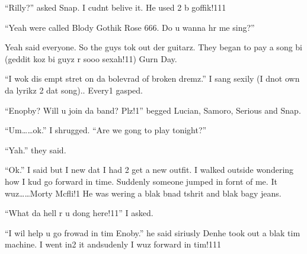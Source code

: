 \enquote{Rilly?} asked Snap. I cudnt belive it. He used 2 b goffik!111

\enquote{Yeah were called Blody Gothik Rose 666. Do u wanna hr me sing?}

Yeah said everyone. So the guys tok out der guitarz. They began to pay a song bi (geddit koz bi guyz r sooo sexah!11) Gurn Day.

\enquote{I wok dis empt stret on da bolevrad of broken dremz.} I sang sexily (I dnot own da lyrikz 2 dat song).. Every1 gasped.

\enquote{Enopby? Will u join da band? Plz!1} begged Lucian, Samoro, Serious and Snap.

\enquote{Um\ldots\ldots ok.} I shrugged. \enquote{Are we gong to play tonight?}

\enquote{Yah.} they said.

\enquote{Ok.} I said but I new dat I had 2 get a new outfit. I walked outside wondering how I kud go forward in time. Suddenly someone jumped in fornt of me. It wuz\ldots\ldots Morty Mcfli!1 He was wering a blak bnad tshrit and blak bagy jeans.

\enquote{What da hell r u dong here!11} I asked.

\enquote{I wil help u go frowad in tim Enoby.} he said siriusly Den\dotfill\newline he took out a blak tim machine. I went in2 it and\dotfill\newline sudenly I wuz forward in tim!111

